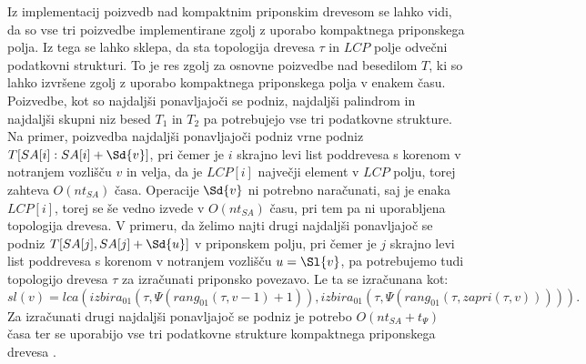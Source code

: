 Iz implementacij poizvedb nad kompaktnim priponskim drevesom se lahko vidi, da so vse tri poizvedbe implementirane zgolj z uporabo kompaktnega priponskega polja. Iz tega se lahko sklepa, da sta topologija drevesa $\tau$ in $LCP$ polje odvečni podatkovni strukturi. To je res zgolj za osnovne poizvedbe nad besedilom $T$, ki so lahko izvršene zgolj z uporabo kompaktnega priponskega polja v enakem času. Poizvedbe, kot so najdaljši ponavljajoči se podniz, najdaljši palindrom in najdaljši skupni niz besed $T_1$ in $T_2$ pa potrebujejo vse tri podatkovne strukture. Na primer, poizvedba najdaljši ponavljajoči podniz vrne podniz $T[SA[i]:SA[i]+\Sd{v}]$, pri čemer je $i$ skrajno levi list poddrevesa s korenom v notranjem vozlišču $v$ in velja, da je $LCP[i]$ največji element v $LCP$ polju, torej zahteva $O(nt_{SA})$ časa. Operacije $\Sd{v}$ ni potrebno naračunati, saj je enaka $LCP[i]$, torej se še vedno izvede v $O(nt_{SA})$ času, pri tem pa ni uporabljena topologija drevesa. V primeru, da želimo najti drugi najdaljši ponavljajoč se podniz $T[SA[j],SA[j]+\Sd{u}]$ v priponskem polju, pri čemer je $j$ skrajno levi list poddrevesa s korenom v notranjem vozlišču $u=\Sl{v}$, pa potrebujemo tudi topologijo drevesa $\tau$ za izračunati priponsko povezavo. Le ta se izračunana kot:
$$
    sl(v)=lca(izbira_{01}(\tau,\Psi(rang_{01}(\tau,v-1)+1)),izbira_{01}(\tau,\Psi(rang_{01}(\tau,zapri(\tau,v))))).
$$
Za izračunati drugi najdaljši ponavljajoč se podniz je potrebo $O(nt_{SA}+t_\Psi)$ časa ter se uporabijo vse tri podatkovne strukture kompaktnega priponskega drevesa \cite{Valimaki2007, Weiner1973, Navarro2016}.
